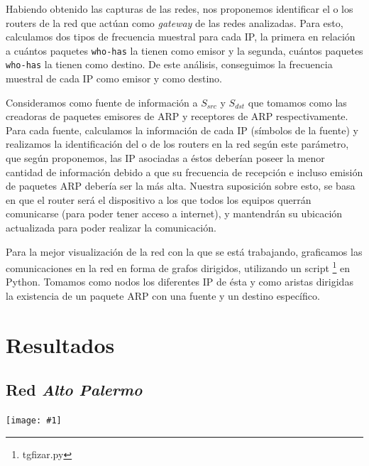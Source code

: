 \documentclass[a4paper, 10pt, twoside]{article}
\newcommand{\grafo}[1]{
  \texttt{[image: \#1]}
}
\begin{document}
Habiendo obtenido las capturas de las redes, nos proponemos identificar el o los routers de la red que actúan como \textit{gateway} de las redes analizadas. Para esto, calculamos dos tipos de frecuencia muestral para cada IP, la primera en relación a cuántos paquetes \texttt{who-has} la tienen como emisor y la segunda, cuántos paquetes \texttt{who-has} la tienen como destino. De este análisis, conseguimos la frecuencia muestral de cada IP como emisor y como destino.

Consideramos como fuente de información a $S_{src}$ y $S_{dst}$ que tomamos como las creadoras de paquetes emisores de ARP y receptores de ARP respectivamente. Para cada fuente, calculamos la información de cada IP (símbolos de la fuente) y realizamos la identificación del o de los routers en la red según este parámetro, que según proponemos, las IP asociadas a éstos deberían poseer la menor cantidad de información debido a que su frecuencia de recepción e incluso emisión de paquetes ARP debería ser la más alta. Nuestra suposición sobre esto, se basa en que el router será el dispositivo a los que todos los equipos querrán comunicarse (para poder tener acceso a internet), y mantendrán su ubicación actualizada para poder realizar la comunicación.

Para la mejor visualización de la red con la que se está trabajando, graficamos las comunicaciones en la red en forma de grafos dirigidos, utilizando un script \footnote{tgfizar.py} en Python. Tomamos como nodos los diferentes IP de ésta y como aristas dirigidas la existencia de un paquete ARP con una fuente y un destino específico.



\section{Resultados}




\subsection{Red \emph{Alto Palermo}}

\grafo{altopalermo}
\end{document}
